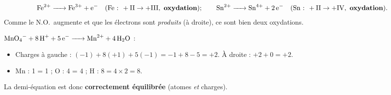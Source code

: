 \documentclass[11pt,a4paper]{article}
\newcommand{\NO}{\ensuremath{\mathrm{N.O.}}}
\begin{document}
\begin{corr}
\[
\ce{Fe^{2+} -> Fe^{3+} + e^-} \quad(\text{Fe : }+\mathrm{II}\to+\mathrm{III},\ \textbf{oxydation}) ; \qquad
\ce{Sn^{2+} -> Sn^{4+} + 2 e^-} \quad(\text{Sn : }+\mathrm{II}\to+\mathrm{IV},\ \textbf{oxydation}).
\]
Comme le \NO\ augmente et que les électrons sont \emph{produits} (à droite), ce sont bien deux oxydations.
\end{corr}

\begin{corr}
$\ce{MnO4^- + 8 H+ + 5 e^- -> Mn^{2+} + 4 H2O}$ :
\begin{itemize}[leftmargin=1.5em,topsep=1pt,itemsep=1pt]
  \item Charges à gauche : $(-1)+8(+1)+5(-1)=-1+8-5=+2$. À droite : $+2 + 0 = +2$. \checkmark
  \item Mn : 1 = 1 ; O : 4 = 4 ; H : $8 = 4\times2 = 8$. \checkmark
\end{itemize}
La demi-équation est donc \textbf{correctement équilibrée} (atomes \emph{et} charges).
\end{corr}
\end{document}
